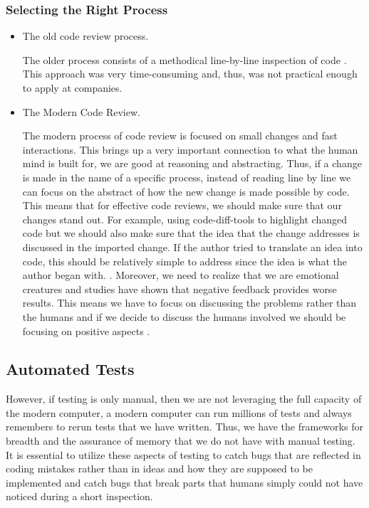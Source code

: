 \documentclass{article}
\begin{document}
\subsubsection{Selecting the Right Process}
\begin{itemize}
    \item The old code review process.

    The older process consists of a methodical line-by-line inspection of code \cite{cassee_silent_2020}. This approach
    was very time-consuming and, thus, was not practical enough to apply at companies.

    \item The Modern Code Review.

    The modern process of code review is focused on small changes and fast interactions. \cite{cassee_silent_2020} 
    This brings up a very important connection to what the human mind is built for, we are good at reasoning and abstracting. 
    Thus, if a change is made in the name of a specific process, instead of reading line by line we can focus on the abstract of how the new change is made possible by code. 
    This means that for effective code reviews, we should make sure that our changes stand out. For example, using code-diff-tools to highlight changed code but we should also make 
    sure that the idea that the change addresses is discussed in the imported change. 
    If the author tried to translate an idea into code, this should be relatively simple to address since the idea is what the author began with. \cite{sadowski_modern_2018}.
    Moreover, we need to realize that we are emotional creatures and studies have shown that negative feedback provides worse results. This means 
    we have to focus on discussing the problems rather than the humans and 
    if we decide to discuss the humans involved we should be focusing on positive aspects \cite{sadowski_modern_2018}.
\end{itemize}
\subsection{Automated Tests}

However, if testing is only manual, then we are not leveraging the full capacity of the modern computer, a modern computer can run millions of tests and always remembers to rerun tests that we have written. Thus, we have the frameworks for breadth and the assurance of memory that we do not have with manual testing. It is essential to utilize these aspects of testing to catch bugs that are reflected in coding mistakes rather than in ideas and how they are supposed to be implemented and catch bugs that break parts that humans simply could not have noticed during a short inspection.
\end{document}
